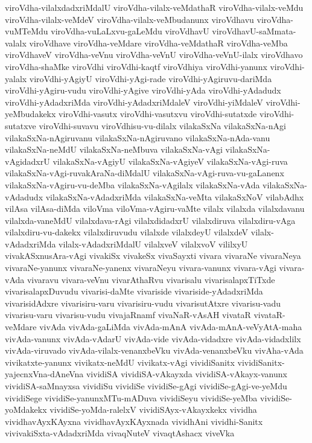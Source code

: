 {viroVdha-vilalxdadxriMdalU
viroVdha-vilalx-veMdathaR
viroVdha-vilalx-veMdu
viroVdha-vilalx-veMdeV
viroVdha-vilalx-veMbudanunx
viroVdhavu
viroVdha-vuMTeMdu
viroVdha-vuLaLxvu-gaLeMdu
viroVdhavU
viroVdhavU-saMmata-valalx
viroVdhave
viroVdha-veMdare
viroVdha-veMdathaR
viroVdha-veMba
viroVdhaveV
viroVdha-veVnu
viroVdha-veVnU
viroVdha-veVnU-ilalx
viroVdhavo
viroVdha-shaMke
viroVdhi
viroVdhi-kaqtf
viroVdhiya
viroVdhi-yanunx
viroVdhi-yalalx
viroVdhi-yAgiyU
viroVdhi-yAgi-rade
viroVdhi-yAgiruvu-dariMda
viroVdhi-yAgiru-vudu
viroVdhi-yAgive
viroVdhi-yAda
viroVdhi-yAdadudx
viroVdhi-yAdadxriMda
viroVdhi-yAdadxriMdaleV
viroVdhi-yiMdaleV
viroVdhi-yeMbudakekx
viroVdhi-vasutx
viroVdhi-vasutxvu
viroVdhi-sutatxde
viroVdhi-sutatxve
viroVdhi-suvavu
viroVdhisu-vu-dilalx
vilakaSxNa
vilakaSxNa-nAgi
vilakaSxNa-nAgiruvanu
vilakaSxNa-nAgiruvano
vilakaSxNa-nAda-vanu
vilakaSxNa-neMdU
vilakaSxNa-neMbuva
vilakaSxNa-vAgi
vilakaSxNa-vAgidadxrU
vilakaSxNa-vAgiyU
vilakaSxNa-vAgiyeV
vilakaSxNa-vAgi-ruva
vilakaSxNa-vAgi-ruvakAraNa-diMdalU
vilakaSxNa-vAgi-ruva-vu-gaLanenx
vilakaSxNa-vAgiru-vu-deMba
vilakaSxNa-vAgilalx
vilakaSxNa-vAda
vilakaSxNa-vAdadudx
vilakaSxNa-vAdadxriMda
vilakaSxNa-veMta
vilakaSxNoV
vilabAdhx
vilAsa
vilAsa-diMda
viloVma
viloVma-vAgiru-vaMte
vilalx
vilalxda
vilalxdavanu
vilalxda-vaneMdU
vilalxdava-rAgi
vilalxdidadxrU
vilalxdiruva
vilalxdiru-vAga
vilalxdiru-vu-dakekx
vilalxdiruvudu
vilalxde
vilalxdeyU
vilalxdeV
vilalx-vAdadxriMda
vilalx-vAdadxriMdalU
vilalxveV
vilalxvoV
vililxyU
vivakASxnusAra-vAgi
vivakiSx
vivakeSx
vivaSayxti
vivara
vivaraNe
vivaraNeya
vivaraNe-yanunx
vivaraNe-yanenx
vivaraNeyu
vivara-vanunx
vivara-vAgi
vivara-vAda
vivaravu
vivara-veVnu
vivarAthaRvu
vivarisalu
vivarisalapxTiTxde
vivarisalapxDuvudu
vivarisi-daMte
vivariside
vivariside-yAdadxriMda
vivarisidAdxre
vivarisiru-varu
vivarisiru-vudu
vivarisutAtxre
vivarisu-vadu
vivarisu-varu
vivarisu-vudu
vivajaRnamf
vivaNaR-vAsAH
vivataR
vivataR-veMdare
vivAda
vivAda-gaLiMda
vivAda-mAnA
vivAda-mAnA-veVyAtA-maha
vivAda-vanunx
vivAda-vAdarU
vivAda-vide
vivAda-vidadxre
vivAda-vidadxlilx
vivAda-viruvado
vivAda-vilalx-venanxbeVku
vivAda-venanxbeVku
vivAha-vAda
vivikatxte-yanunx
vivikatx-neMdU
vivikatx-vAgi
vividiSanitx
vividiSanitx-yajecnxVna-dAneVna
vividiSA
vividiSA-vAkayxda
vividiSA-vAkayx-vanunx
vividiSA-saMnayxsa
vividiSu
vividiSe
vividiSe-gAgi
vividiSe-gAgi-ve-yeMdu
vividiSege
vividiSe-yanunxMTu-mADuva
vividiSeyu
vividiSe-yeMba
vividiSe-yoMdakekx
vividiSe-yoMda-ralelxV
vividiSAyx-vAkayxkekx
vividha
vividhavAyxKAyxna
vividhavAyxKAyxnada
vividhAni
vividhi-Sanitx
vivivakiSxta-vAdadxriMda
vivaqNuteV
vivaqtAshacx
viveVka
}
